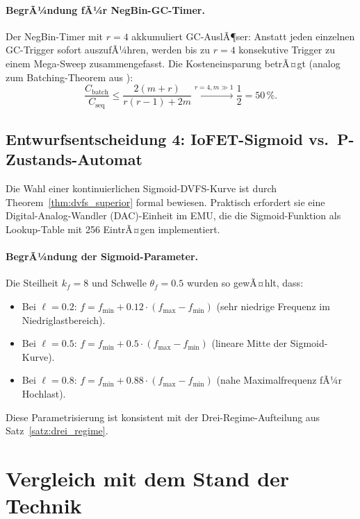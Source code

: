 ﻿\documentclass[a4paper,12pt]{scrreprt}
\theoremstyle{definition}
\begin{document}
	\paragraph{BegrÃ¼ndung fÃ¼r NegBin-GC-Timer.}
	Der NegBin-Timer mit $r = 4$ akkumuliert GC-AuslÃ¶ser: Anstatt jeden
	einzelnen GC-Trigger sofort auszufÃ¼hren, werden bis zu $r = 4$
	konsekutive Trigger zu einem Mega-Sweep zusammengefasst. Die
	Kosteneinsparung betrÃ¤gt (analog zum Batching-Theorem aus \cite{epp2026archiv}):
	\[
	\frac{C_{\mathrm{batch}}}{C_{\mathrm{seq}}} \le \frac{2(m+r)}{r(r-1)+2m}
	\xrightarrow{r=4, m \gg 1} \frac{1}{2} = 50\,\%.
	\]
	
	\subsection{Entwurfsentscheidung 4: IoFET-Sigmoid vs.\ P-Zustands-Automat}
	
	Die Wahl einer kontinuierlichen Sigmoid-DVFS-Kurve ist durch
	Theorem~\ref{thm:dvfs_superior} formal bewiesen. Praktisch
	erfordert sie eine Digital-Analog-Wandler (DAC)-Einheit im EMU,
	die die Sigmoid-Funktion als Lookup-Table mit 256 EintrÃ¤gen
	implementiert.
	
	\paragraph{BegrÃ¼ndung der Sigmoid-Parameter.}
	Die Steilheit $k_f = 8$ und Schwelle $\theta_f = 0.5$ wurden so
	gewÃ¤hlt, dass:
	\begin{itemize}[noitemsep]
		\item Bei $\ell = 0.2$: $f = f_{\min} + 0.12 \cdot (f_{\max} - f_{\min})$
		(sehr niedrige Frequenz im Niedriglastbereich).
		\item Bei $\ell = 0.5$: $f = f_{\min} + 0.5 \cdot (f_{\max} - f_{\min})$
		(lineare Mitte der Sigmoid-Kurve).
		\item Bei $\ell = 0.8$: $f = f_{\min} + 0.88 \cdot (f_{\max} - f_{\min})$
		(nahe Maximalfrequenz fÃ¼r Hochlast).
	\end{itemize}
	Diese Parametrisierung ist konsistent mit der Drei-Regime-Aufteilung
	aus Satz~\ref{satz:drei_regime}.
	
	\section{Vergleich mit dem Stand der Technik}
	
\end{document}
